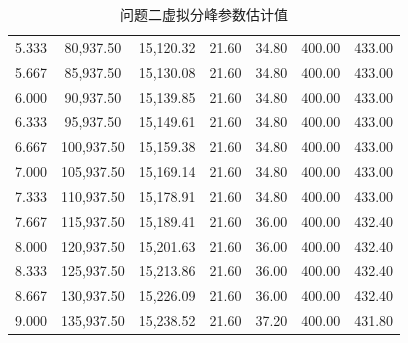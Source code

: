 \documentclass{article}
\numberwithin{equation}{subsection}
\begin{document}
\begin{table}[h]
\begin{tabular}{|c|c|c|c|c|c|c|}
        5.333&80,937.50
        &15,120.32
        &21.60
        &34.80
        &400.00
        &433.00\\

        5.667&85,937.50
        &15,130.08
        &21.60
        &34.80
        &400.00
        &433.00\\

        6.000&90,937.50
        &15,139.85
        &21.60
        &34.80
        &400.00
        &433.00\\

        6.333&95,937.50
        &15,149.61
        &21.60
        &34.80
        &400.00
        &433.00\\

        6.667&100,937.50
        &15,159.38
        &21.60
        &34.80
        &400.00
        &433.00\\

        7.000&105,937.50
        &15,169.14
        &21.60
        &34.80
        &400.00
        &433.00\\

        7.333&110,937.50
        &15,178.91
        &21.60
        &34.80
        &400.00
        &433.00\\

        7.667&115,937.50
        &15,189.41
        &21.60
        &36.00
        &400.00
        &432.40\\

        8.000&120,937.50
        &15,201.63
        &21.60
        &36.00
        &400.00
        &432.40\\

        8.333&125,937.50
        &15,213.86
        &21.60
        &36.00
        &400.00
        &432.40\\

        8.667&130,937.50
        &15,226.09
        &21.60
        &36.00
        &400.00
        &432.40\\

        9.000&135,937.50
        &15,238.52
        &21.60
        &37.20
        &400.00
        &431.80\\

        
        \hline
    \end{tabular}
    \caption{问题二虚拟分峰参数估计值}
    \label{问题二虚拟分峰参数估计值}
\end{table}
\newpage
\end{document}
